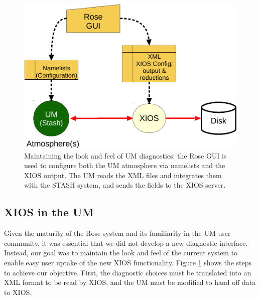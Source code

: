 \documentclass[twocolumn, 5p, times]{elsarticle}
\begin{document}
\begin{figure}
	\centerline{
		\includegraphics[scale=0.5]{figures/xios_config.pdf}
	}
	\caption{Maintaining the look and feel of UM diagnostics: the Rose GUI is used to configure both the UM atmosphere via namelists and the XIOS output. The UM reads the XML files and integrates them with the STASH system, and sends the fields to the XIOS server.} \label{fig-xconfig}
\end{figure}





\subsection{XIOS in the UM}

Given the maturity of the Rose system and its familiarity in the UM user community, it was essential that we did not develop a new diagnostic interface. Instead, our goal was to maintain the look and feel of the current system to enable easy user uptake of the new XIOS functionality. Figure \ref{fig-xconfig} shows the steps to achieve our objective. First, the diagnostic choices must be translated into an XML format to be read by XIOS, and the UM must be modified to hand off data to XIOS. 
\end{document}
